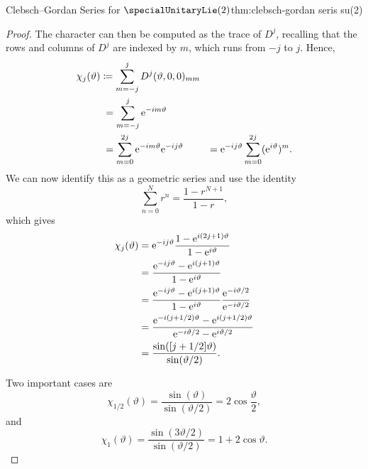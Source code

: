 \begin{thm}{Clebsch--Gordan Series for \(\specialUnitaryLie(2)\)}{thm:clebsch-gordan seris su(2)}
\begin{proof}
        The character can then be computed as the trace of \(D^j\), recalling that the rows and columns of \(D^j\) are indexed by \(m\), which runs from \(-j\) to \(j\).
        Hence,
        \begin{align}
            \chi_j(\vartheta) &\coloneqq \sum_{m = -j}^{j} D^j(\vartheta, 0, 0)_{mm}\\
            &\hphantom{:}= \sum_{m = -j}^{j} \mathrm{e}^{-im\vartheta}\\
            &\hphantom{:}= \sum_{m = 0}^{2j} \mathrm{e}^{-im\vartheta}\mathrm{e}^{-ij\vartheta}
            &= \mathrm{e}^{-ij\vartheta} \sum_{m = 0}^{2j} (\mathrm{e}^{i\vartheta})^{m}.
        \end{align}
        We can now identify this as a geometric series and use the identity
        \begin{equation}
            \sum_{n = 0}^{N} r^n = \frac{1 - r^{N + 1}}{1 - r},
        \end{equation}
        which gives
        \begin{align}
            \chi_j(\vartheta) &= \mathrm{e}^{-ij\vartheta} \frac{1 - \mathrm{e}^{i(2j + 1)\vartheta}}{1 - \mathrm{e}^{i\vartheta}}\\
            &= \frac{\mathrm{e}^{-ij\vartheta} - \mathrm{e}^{i(j + 1)\vartheta}}{1 - \mathrm{e}^{i\vartheta}}\\
            &= \frac{\mathrm{e}^{-ij\vartheta} - \mathrm{e}^{i(j + 1)\vartheta}}{1 - \mathrm{e}^{i\vartheta}}\frac{\mathrm{e}^{-i\vartheta/2}}{\mathrm{e}^{-i\vartheta/2}}\\
            &= \frac{\mathrm{e}^{-i(j + 1/2)\vartheta} - \mathrm{e}^{i(j + 1/2)\vartheta}}{\mathrm{e}^{-i\vartheta/2} - \mathrm{e}^{i\vartheta/2}}\\
            &= \frac{\sin([j + 1/2]\vartheta)}{\sin(\vartheta/2)}.
        \end{align}
        
        Two important cases are
        \begin{equation}
            \chi_{1/2}(\vartheta) = \frac{\sin(\vartheta)}{\sin(\vartheta/2)} = 2\cos\frac{\vartheta}{2},
        \end{equation}
        and
        \begin{equation}
            \chi_1(\vartheta) = \frac{\sin(3\vartheta/2)}{\sin(\vartheta/2)} = 1 + 2\cos\vartheta.
        \end{equation}
        

\end{proof}
\end{thm}
